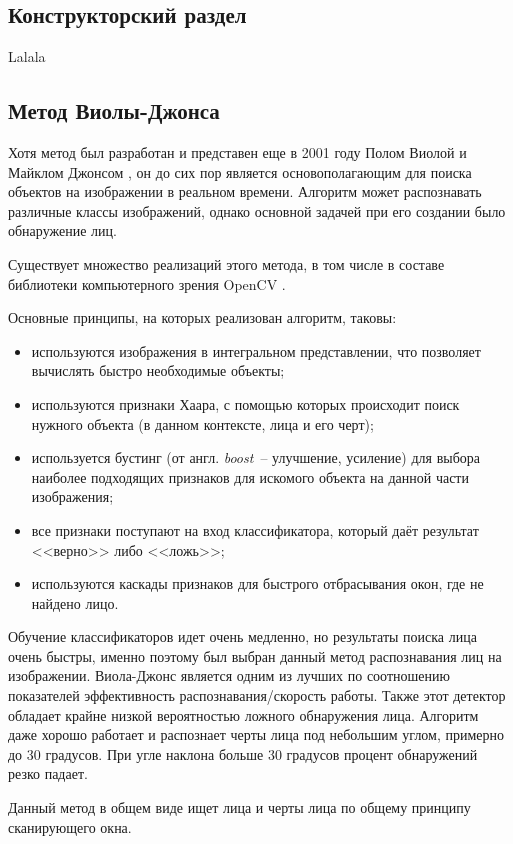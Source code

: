 \subsection{Конструкторский раздел}

Lalala

\subsection{Метод Виолы-Джонса}

Хотя метод был разработан и представен еще в 2001 году Полом Виолой и Майклом
Джонсом \cite{viola_jones}, он до сих пор является основополагающим для поиска
объектов на изображении в реальном времени.
Алгоритм может распознавать различные классы изображений, однако основной задачей
при его создании было обнаружение лиц.

Существует множество реализаций этого метода, в том числе в составе библиотеки
компьютерного зрения OpenCV \cite{opencv}.

Основные принципы, на которых реализован алгоритм, таковы:
\begin{itemize}
    \item используются изображения в интегральном представлении,
        что позволяет вычислять быстро необходимые объекты;
    \item используются признаки Хаара, с помощью которых происходит
        поиск нужного объекта (в данном контексте, лица и его черт);
    \item используется бустинг (от англ. \textit{boost}~-- улучшение,
        усиление) для выбора наиболее подходящих признаков для искомого
        объекта на данной части изображения;
    \item все признаки поступают на вход классификатора,
        который даёт результат <<верно>> либо <<ложь>>;
    \item используются каскады признаков для быстрого отбрасывания окон,
        где не найдено лицо.
\end{itemize}

Обучение классификаторов идет очень медленно, но результаты поиска
лица очень быстры, именно поэтому был выбран данный метод
распознавания лиц на изображении. Виола-Джонс является
одним из лучших по соотношению показателей эффективность
распознавания/скорость работы. Также этот детектор
обладает крайне низкой вероятностью ложного обнаружения лица. Алгоритм
даже хорошо работает и распознает черты
лица под небольшим углом, примерно до 30 градусов. При угле
наклона больше 30 градусов
процент обнаружений резко падает.

Данный метод в общем виде ищет лица и черты лица по общему
принципу сканирующего окна.

\clearpage
